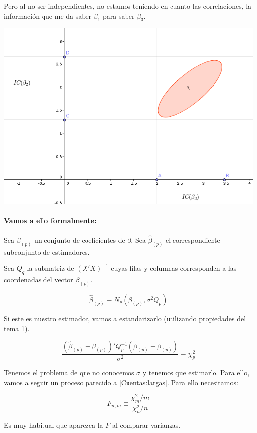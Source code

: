  Pero al no ser independientes, no estamos teniendo en cuanto las correlaciones, la información que me da saber $β_1$ para saber $β_3$.

\begin{center}
\includegraphics[scale=0.5]{img/confianzamultivariantebien.png}
\end{center}

\paragraph{Vamos a ello formalmente:}
\newcommand{\bpp}{β_{(p)}}
\newcommand{\hbpp}{\hat{β}_{(p)}}
\newcommand{\fpnk}{F_{p,n-k-1}}
Sea $β_{(p)}$ un conjunto de coeficientes de $β$. Sea $\hbpp$ el correspondiente subconjunto de estimadores.

Sea $Q_q$ la submatriz de $(X'X)^{-1}$ cuyas filas y columnas corresponden a las coordenadas del vector $\bpp$.

\[\hbpp \equiv N_p \left( \bpp, σ^2Q_p \right)\]

Si este es nuestro estimador, vamos a estandarizarlo (utilizando propiedades del tema 1).

\[
\frac{(\hbpp - \bpp)'Q_p^{-1}(\hbpp - \bpp)}{σ^2}\equiv \chi^2_p
\]

Tenemos el problema de que no conocemos $σ$ y tenemos que estimarlo. Para ello, vamos a seguir un proceso parecido a \ref{Cuentas:largas}. Para ello necesitamos:

\begin{defn}[Distribución $F_{n,m}$]

\[
F_{n,m} \equiv \frac{\chi^2_m / m}{\chi^2_n / n}
\]

Es muy habitual que aparezca la $F$ al comparar varianzas.
\end{defn}

